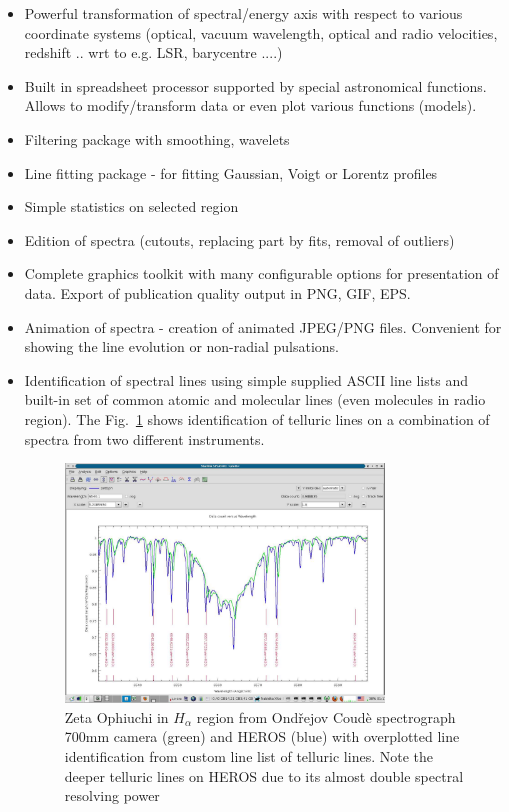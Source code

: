 \documentclass[final,authoryear,5p,times,twocolumn]{elsarticle}
\begin{document}
\begin{itemize}
\item Powerful transformation of spectral/energy axis with respect to various
coordinate systems (optical, vacuum wavelength, optical and radio velocities,
redshift .. wrt to e.g. LSR, barycentre ....)

\item Built in spreadsheet processor supported by special astronomical
functions. Allows to modify/transform data or even plot various functions
(models).

\item Filtering package with smoothing, wavelets

\item Line fitting package - for fitting Gaussian, Voigt or Lorentz profiles

\item Simple statistics on selected region

\item Edition of spectra (cutouts, replacing part by fits, removal of outliers)

\item Complete graphics toolkit with many configurable options for
presentation of data. Export of publication quality output in PNG, GIF, EPS.

\item Animation of spectra - creation of animated JPEG/PNG files. Convenient
for showing the line evolution or non-radial pulsations.

\item Identification of spectral lines using simple supplied ASCII line lists and
built-in set of common  atomic and molecular lines (even molecules in radio
region). The Fig.~\ref{fig:zetoph2sp-id} shows identification of telluric lines on a combination of spectra from two different instruments.

\begin{figure}[t]
\begin{center}
\includegraphics[width=0.8\textwidth]{zetoph2sp-id.pdf}
\caption{Zeta Ophiuchi in $H_\alpha$ region from Ond\v{r}ejov Coud\`e spectrograph 700mm camera (green) and HEROS (blue) with overplotted line identification from custom line list of telluric lines. Note the deeper telluric lines on HEROS due to its almost double  spectral resolving power}
\label{fig:zetoph2sp-id}
\end{center}
\end{figure}



\end{itemize}
\end{document}
